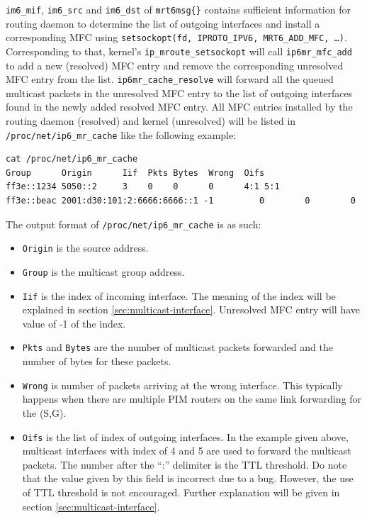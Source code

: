 \documentclass{article}
\begin{document}
\texttt{im6\_mif}, \texttt{im6\_src} and \texttt{im6\_dst} of
\texttt{mrt6msg\{\}} contains sufficient information for routing daemon to
determine the list of outgoing interfaces and install a corresponding MFC using
\texttt{setsockopt(fd, IPROTO\_IPV6, MRT6\_ADD\_MFC, \ldots)}. Corresponding to
that, kernel's \texttt{ip\_mroute\_setsockopt} will call
\texttt{ip6mr\_mfc\_add} to add a new (resolved) MFC entry and remove the
corresponding unresolved MFC entry from the list. \texttt{ip6mr\_cache\_resolve}
will forward all the queued multicast packets in the unresolved MFC entry to the
list of outgoing interfaces found in the newly added resolved MFC entry. All MFC
entries installed by the routing daemon (resolved) and kernel (unresolved) will
be listed in \texttt{/proc/net/ip6\_mr\_cache} like the following example:

\begin{lstlisting}
cat /proc/net/ip6_mr_cache
Group      Origin      Iif  Pkts Bytes  Wrong  Oifs
ff3e::1234 5050::2     3    0    0      0      4:1 5:1
ff3e::beac 2001:d30:101:2:6666:6666::1 -1         0        0        0

\end{lstlisting}

The output format of \texttt{/proc/net/ip6\_mr\_cache} is as such:
\begin{itemize}
  \item \texttt{Origin} is the source address.
  \item \texttt{Group} is the multicast group address. 
  \item \texttt{Iif} is the index of incoming interface. The meaning of the
    index will be explained in section \ref{sec:multicast-interface}. Unresolved
    MFC entry will have value of -1 of the index.
  \item \texttt{Pkts} and \texttt{Bytes} are the number of multicast packets
    forwarded and the number of bytes for these packets.
  \item \texttt{Wrong} is number of packets arriving at the wrong interface.
    This typically happens when there are multiple PIM routers on the same link
    forwarding for the (S,G).
  \item \texttt{Oifs} is the list of index of outgoing interfaces. In the
    example given above, multicast interfaces with index of 4 and 5 are used to
    forward the multicast packets. The number after the ``:'' delimiter is the
    TTL threshold. Do note that the value given by this field is incorrect due
    to a bug. However, the use of TTL threshold is not encouraged. Further
    explanation will be given in section \ref{sec:multicast-interface}.
\end{itemize}
\end{document}
